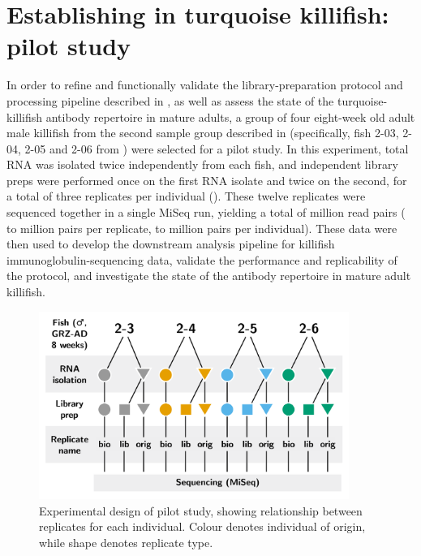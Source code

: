 \section{Establishing \igseq in turquoise killifish: pilot study}
\label{sec:igseq_pilot}

In order to refine and functionally validate the library-preparation protocol and processing pipeline described in , as well as assess the state of the turquoise-killifish antibody repertoire in mature adults, a group of four eight-week old adult male killifish from the second sample group described in  (specifically, fish 2-03, 2-04, 2-05 and 2-06 from ) were selected for a pilot study. In this experiment, total RNA was isolated twice independently from each fish, and independent library preps were performed once on the first RNA isolate and twice on the second, for a total of three replicates per individual (). These twelve replicates were sequenced together in a single MiSeq run, yielding a total of  million read pairs ( to  million pairs per replicate,  to  million pairs per individual). These data were then used to develop the downstream analysis pipeline for killifish immunoglobulin-sequencing data, validate the performance and replicability of the protocol, and investigate the state of the antibody repertoire in mature adult killifish. %

\begin{figure}
\centering
\includegraphics[width = 0.9\textwidth]{_Figures/png_edited/igseq-pilot-design_wide.png}
\caption{Experimental design of pilot study, showing relationship between replicates for each individual. Colour denotes individual of origin, while shape denotes replicate type.}
\label{fig:igseq-pilot-design}
\end{figure}

